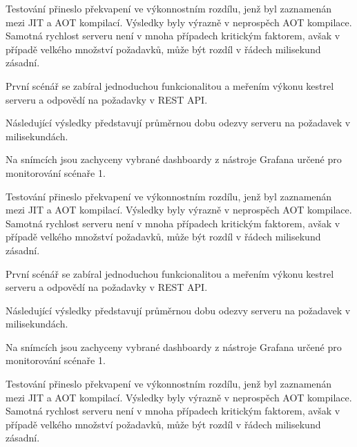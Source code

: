 Testování přineslo překvapení ve výkonnostním rozdílu, jenž byl zaznamenán mezi JIT a AOT kompilací. Výsledky byly výrazně v neprospěch AOT kompilace. Samotná rychlost serveru není v mnoha případech kritickým faktorem, avšak v případě velkého množství požadavků, může být rozdíl v řádech milisekund zásadní.


První scénář se zabíral jednoduchou funkcionalitou a meřením výkonu kestrel serveru a odpovědí na požadavky v REST API.


Následující výsledky představují průměrnou dobu odezvy serveru na požadavek v milisekundách. 

Na snímcích jsou zachyceny vybrané dashboardy z nástroje Grafana určené pro monitorování scénaře 1. 


Testování přineslo překvapení ve výkonnostním rozdílu, jenž byl zaznamenán mezi JIT a AOT kompilací. Výsledky byly výrazně v neprospěch AOT kompilace. Samotná rychlost serveru není v mnoha případech kritickým faktorem, avšak v případě velkého množství požadavků, může být rozdíl v řádech milisekund zásadní.


První scénář se zabíral jednoduchou funkcionalitou a meřením výkonu kestrel serveru a odpovědí na požadavky v REST API.


Následující výsledky představují průměrnou dobu odezvy serveru na požadavek v milisekundách. 

Na snímcích jsou zachyceny vybrané dashboardy z nástroje Grafana určené pro monitorování scénaře 1. 


Testování přineslo překvapení ve výkonnostním rozdílu, jenž byl zaznamenán mezi JIT a AOT kompilací. Výsledky byly výrazně v neprospěch AOT kompilace. Samotná rychlost serveru není v mnoha případech kritickým faktorem, avšak v případě velkého množství požadavků, může být rozdíl v řádech milisekund zásadní.
